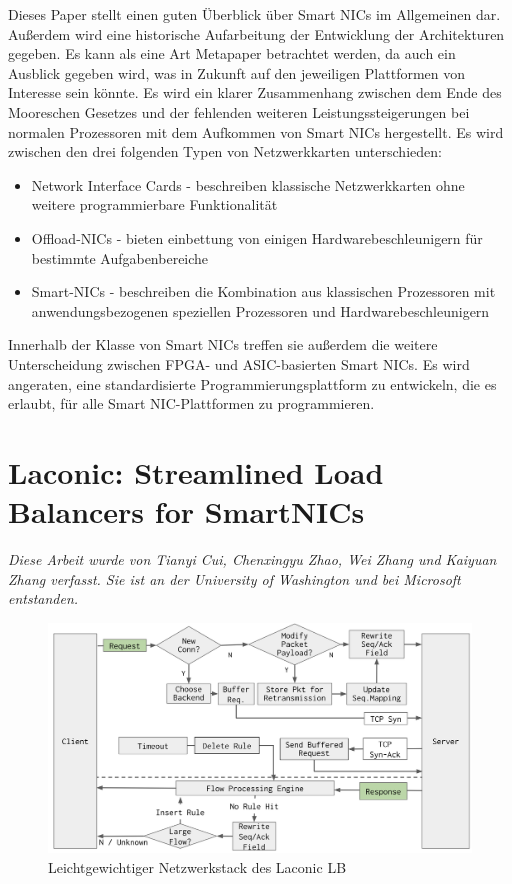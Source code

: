 Dieses Paper stellt einen guten Überblick über Smart NICs im Allgemeinen dar. Außerdem wird eine historische Aufarbeitung der Entwicklung der Architekturen gegeben. Es kann als eine Art Metapaper betrachtet werden, da auch ein Ausblick gegeben wird, was in Zukunft auf den jeweiligen Plattformen von Interesse sein könnte. Es wird ein klarer Zusammenhang zwischen dem Ende des Mooreschen Gesetzes und der fehlenden weiteren Leistungssteigerungen bei normalen Prozessoren mit dem Aufkommen von Smart NICs hergestellt. Es wird zwischen den drei folgenden Typen von Netzwerkkarten unterschieden:
\begin{itemize}
    \item Network Interface Cards - beschreiben klassische Netzwerkkarten ohne weitere programmierbare Funktionalität
    \item Offload-NICs - bieten einbettung von einigen Hardwarebeschleunigern für bestimmte Aufgabenbereiche
    \item Smart-NICs - beschreiben die Kombination aus klassischen Prozessoren mit anwendungsbezogenen speziellen Prozessoren und Hardwarebeschleunigern
\end{itemize}
Innerhalb der Klasse von Smart NICs treffen sie außerdem die weitere Unterscheidung zwischen FPGA- und ASIC-basierten Smart NICs. Es wird angeraten, eine standardisierte Programmierungsplattform zu entwickeln, die es erlaubt, für alle Smart NIC-Plattformen zu programmieren.
\section{Laconic: Streamlined Load Balancers for SmartNICs}
\textit{Diese Arbeit wurde von Tianyi Cui, Chenxingyu Zhao, Wei Zhang und Kaiyuan Zhang  verfasst. Sie ist an der University of Washington und bei Microsoft entstanden.}
\begin{figure}
    \centering
    \includegraphics[width=1\linewidth]{images/laconic_workflow_v1.png}
    \caption{Leichtgewichtiger Netzwerkstack des Laconic LB}
    \label{fig:enter-label}
\end{figure}

